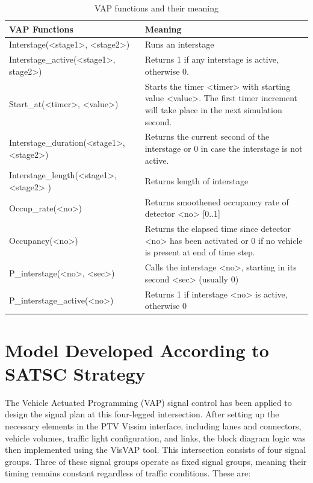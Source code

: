  \begin{table}[h]
    \centering
    \caption{ VAP functions and their meaning \cite{ptv2022vissim}}

    \begin{tabular}{|V{6cm}|V{8cm}|}
        \hline
        \textbf{VAP Functions} & \textbf{Meaning} \\
        \hline
        Interstage(<stage1>, <stage2>) & Runs an interstage \\
        \hline
        Interstage\_active(<stage1>, stage2>) & Returns 1 if any interstage is active, otherwise 0. \\
        \hline
        Start\_at(<timer>, <value>) & Starts the timer <timer> with starting value <value>. 
        The first  timer increment will take place in the next simulation second. \\
        \hline
        Interstage\_duration(<stage1>, <stage2>) & Returns the current second of the interstage or 0 in case the interstage is not active. \\
        \hline
        Interstage\_length(<stage1>, <stage2> ) & Returns length of interstage \\
        \hline 
        Occup\_rate(<no>) &	Returns smoothened occupancy rate of detector <no> [0..1] \\
        \hline
        Occupancy(<no>) & Returns the elapsed time since detector <no> has been activated or 0 if no vehicle is present at end of time step. \\
        \hline 
        P\_interstage(<no>, <sec>)	& Calls the interstage <no>, starting in its second <sec> (usually 0) \\
        \hline
        P\_interstage\_active(<no>) & Returns 1 if interstage <no> is active, otherwise 0 \\
        \hline

    \end{tabular}

 \end{table}

 \newpage
 \section{Model Developed According to SATSC Strategy}

 The Vehicle Actuated Programming (VAP) signal control has been 
 applied to design the signal plan at this four-legged 
 intersection. After setting up the necessary elements in the 
 PTV Vissim interface, including lanes and connectors, vehicle 
 volumes, traffic light configuration, and links, the block 
 diagram logic was then implemented using the VisVAP tool. 
 This intersection consists of four signal groups. Three of 
 these signal groups operate as fixed signal groups, meaning 
 their timing remains constant regardless of traffic conditions. 
 These are:

